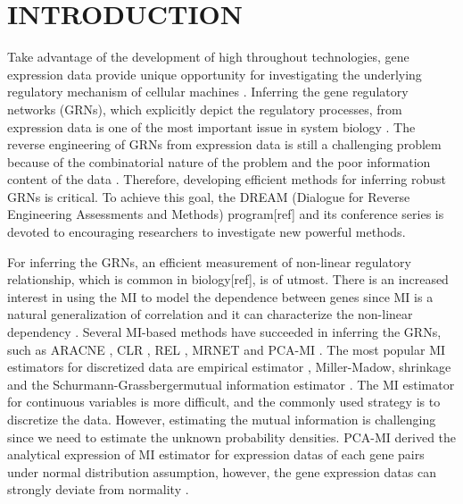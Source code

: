 \documentclass{bioinfo}
\begin{document}
\section{INTRODUCTION}

Take advantage of the development of high throughout technologies, gene expression data provide unique opportunity for investigating the underlying regulatory mechanism of cellular machines \citep{hughes2000functional}. Inferring the gene regulatory networks (GRNs), which explicitly depict the regulatory processes, from expression data is one of the most important issue in system biology \citep{basso2005reverse}. The reverse engineering of GRNs from expression data is still a challenging problem because of the combinatorial nature of the problem and the poor information content of the data \citep{margolin2006reverse}. Therefore, developing efficient methods for inferring robust GRNs is critical. To achieve this goal, the DREAM (Dialogue for Reverse Engineering Assessments and Methods) program[ref] and its conference series is devoted to  encouraging researchers to investigate new powerful methods.

For inferring the GRNs, an efficient measurement of non-linear regulatory relationship, which is common in biology[ref], is of utmost. There is an increased interest in using the MI to  model the dependence between genes since MI is a natural generalization of correlation and it can characterize the non-linear dependency \citep{brunel2010miss,cover2006elements}.  Several MI-based methods have succeeded in inferring the GRNs, such as ARACNE \citep{margolin2006aracne}, CLR \citep{faith2007large}, REL \citep{butte2000mutual} , MRNET \citep{meyer2008minet}  and PCA-MI \citep{zhang2012inferring}. The most popular MI estimators for discretized data are empirical estimator \citep{paninski2003estimation},
Miller-Madow\citep{paninski2003estimation}, shrinkage \citep{schafer2005shrinkage} and the Schurmann-Grassbergermutual information estimator  \citep{schurmann2002entropy}. The MI estimator for continuous variables is more difficult, and the commonly used strategy is to discretize the data\citep{de2012bagging}. However, estimating the mutual information is challenging since we need to estimate the unknown probability densities. PCA-MI \citep{zhang2012inferring} derived the analytical expression of MI estimator for expression datas of each gene pairs under normal distribution assumption, however,  the gene expression datas can strongly deviate from normality \citep{emmert2010local}.
\end{document}
